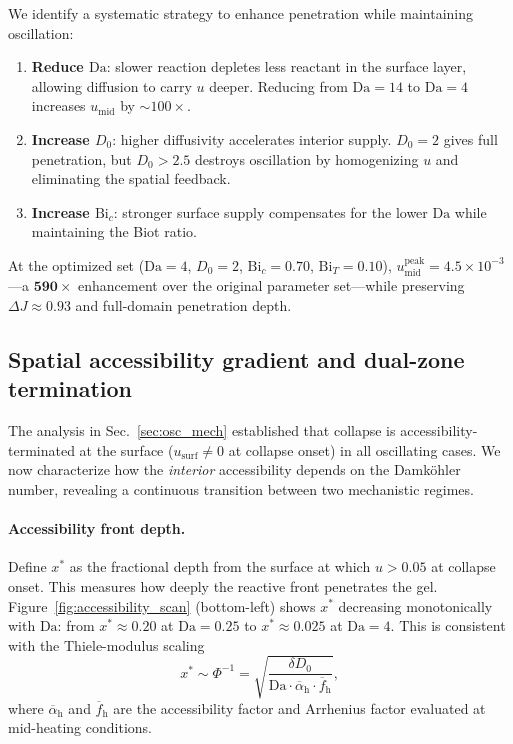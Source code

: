\documentclass[aps,pre,reprint,superscriptaddress,longbibliography,floatfix]{revtex4-2}
\newcommand{\Da}{\mathrm{Da}}
\newcommand{\Bi}{\mathrm{Bi}}
\begin{document}
We identify a systematic strategy to enhance penetration while maintaining
oscillation:
\begin{enumerate}
  \item \textbf{Reduce $\Da$}: slower reaction depletes less reactant in
    the surface layer, allowing diffusion to carry $u$ deeper.
    Reducing from $\Da=14$ to $\Da=4$ increases $u_\mathrm{mid}$ by
    $\sim\!100\times$.
  \item \textbf{Increase $D_0$}: higher diffusivity accelerates interior
    supply. $D_0=2$ gives full penetration, but $D_0>2.5$ destroys
    oscillation by homogenizing $u$ and eliminating the spatial feedback.
  \item \textbf{Increase $\Bi_c$}: stronger surface supply compensates
    for the lower $\Da$ while maintaining the Biot ratio.
\end{enumerate}
At the optimized set ($\Da=4$, $D_0=2$, $\Bi_c=0.70$, $\Bi_T=0.10$),
$u_\mathrm{mid}^\mathrm{peak}= 4.5\times10^{-3}$—a $\mathbf{590\times}$
enhancement over the original parameter set—while preserving $\Delta J
\approx 0.93$ and full-domain penetration depth.

\subsection{Spatial accessibility gradient and dual-zone termination}
\label{sec:accessibility_map}

The analysis in Sec.~\ref{sec:osc_mech} established that collapse is
accessibility-terminated at the surface ($u_\mathrm{surf}\neq 0$ at
collapse onset) in all oscillating cases. We now characterize how the
\emph{interior} accessibility depends on the Damk\"ohler number, revealing
a continuous transition between two mechanistic regimes.

\paragraph{Accessibility front depth.}
Define $x^*$ as the fractional depth from the surface at which $u>0.05$
at collapse onset. This measures how deeply the reactive front penetrates
the gel. Figure~\ref{fig:accessibility_scan} (bottom-left) shows $x^*$
decreasing monotonically with $\Da$: from $x^*\approx 0.20$ at $\Da=0.25$
to $x^*\approx 0.025$ at $\Da=4$. This is consistent with the Thiele-modulus
scaling
\begin{equation}
  x^* \sim \Phi^{-1} = \sqrt{\frac{\delta D_0}{\Da\cdot
  \overline{\alpha}_\mathrm{h}\cdot\overline{f}_\mathrm{h}}},
  \label{eq:xstar_scaling}
\end{equation}
where $\overline{\alpha}_\mathrm{h}$ and $\overline{f}_\mathrm{h}$ are the
accessibility factor and Arrhenius factor evaluated at mid-heating
conditions.
\end{document}

